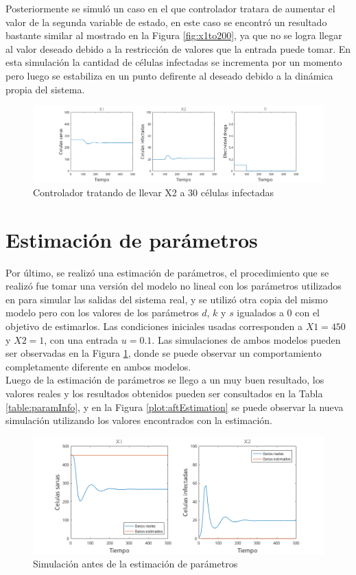 \documentclass{article}
\begin{document}
Posteriormente se simuló un caso en el que controlador tratara de aumentar
el valor de la segunda variable de estado, en este caso se encontró un resultado
bastante similar al mostrado en la Figura \ref{fig:x1to200}, ya que no se logra
llegar al valor deseado debido a la restricción de valores que la entrada puede
tomar. En esta simulación la cantidad de células infectadas se incrementa por un momento
pero luego se estabiliza en un punto defirente al deseado debido a la dinámica
propia del sistema.

\begin{figure}[H]
    \includegraphics[width=\textwidth]{Images/ControlX2Up.png}
    \caption{Controlador tratando de llevar X2 a 30 células infectadas}
\end{figure}

\section{Estimación de parámetros}

Por último, se realizó una estimación de parámetros, el procedimiento que se realizó
fue tomar una versión del modelo no lineal con los parámetros utilizados en \cite{model}
para simular las salidas del sistema real, y se utilizó otra copia del mismo modelo
pero con los valores de los parámetros $d$, $k$ y $s$ igualados a 0 con el objetivo
de estimarlos. Las condiciones iniciales usadas corresponden a $X1 = 450$
y $X2 = 1$, con una entrada $u = 0.1$. Las simulaciones de ambos modelos pueden
ser observadas en la Figura \ref{plot:befEstimation}, donde se puede observar
un comportamiento completamente diferente en ambos modelos.\\

Luego de la estimación de parámetros se llego a un muy buen resultado, los valores
reales y los resultados obtenidos pueden ser consultados en la
Tabla \ref{table:paramInfo}, y en la Figura \ref{plot:aftEstimation} se puede
observar la nueva simulación utilizando los valores encontrados con la estimación.

\begin{figure}[H]
    \includegraphics[width=\textwidth]{Images/BeforeEstimated.png}
    \caption{Simulación antes de la estimación de parámetros}
    \label{plot:befEstimation}
\end{figure}
\end{document}
